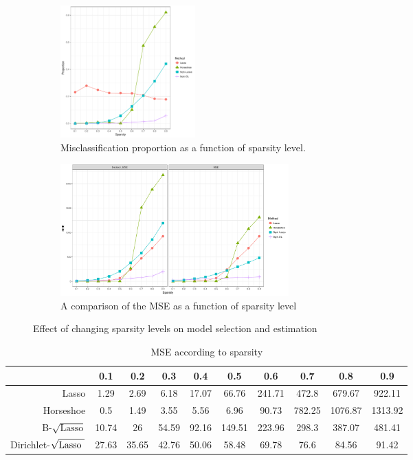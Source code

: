 \documentclass[ba]{imsart}
\def\sql{$\sqrt{\text{Lasso}}$}
\def\sqdl{Dirichlet-$\sqrt{\text{\rm{Lasso} }}$}
\begin{document}
\begin{figure}[ht!]
\centering
\begin{subfigure}[t]{0.8\linewidth}
\centering
\includegraphics[height = 2in, width =\linewidth]{Sparsity_MSP_n=p}
\caption{Misclassification proportion as a function of sparsity level.}
\label{fig:msp}

\end{subfigure}
\begin{subfigure}[t]{0.8\linewidth}
  \centering
  \includegraphics[height = 2in, width=\linewidth]{Sparsity_MSE_high_n=p}\caption{A comparison of the MSE as a function of sparsity level}
\label{fig:test}
\end{subfigure}
\caption{Effect of changing sparsity levels on model selection and estimation}
\label{fig:sparsity}
\end{figure}


\begin{table}[h!]
\caption{MSE according to sparsity}\label{MSE}
\begin{center}
\footnotesize{
\begin{tabular}{c|c|c|c|c|c|c|c|c|c|}
\cline{2-10}
    & 0.1  &  0.2  &  0.3  &  0.4  &  0.5 &   0.6  &  0.7  &  0.8 &   0.9 	\\
\hline
\multicolumn{1}{|r|}{Lasso} & 1.29 &  2.69 &  6.18 &  17.07 & 66.76 &  241.71 & 472.8 &  679.67 &  922.11	\\
\hline
\multicolumn{1}{|r|}{Horseshoe} &   0.5 &   1.49 &  3.55 &  5.56 &  6.96 &   90.73 &  782.25 & 1076.87 & 1313.92 \\
\hline
\multicolumn{1}{|r|}{B-\sql} & 10.74 & 26 &    54.59 & 92.16 & 149.51 & 223.96 & 298.3 &  387.07 &  481.41 \\
\hline
\multicolumn{1}{|r|}{\sqdl} & 27.63 & 35.65 & 42.76 & 50.06 & 58.48 &  69.78 &  76.6 &   84.56 &   91.42 \\
\hline
\end{tabular}}
\end{center}
\end{table}
\end{document}

